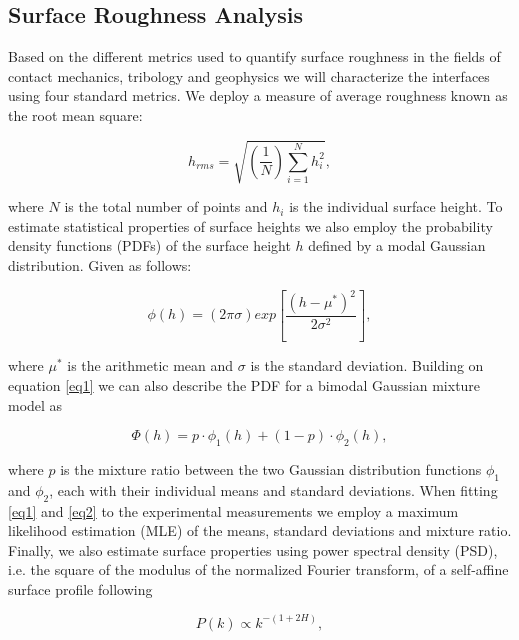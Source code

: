 \documentclass[draft]{agujournal2019}
\begin{document}
\subsection{Surface Roughness Analysis}
\label{SRA}

Based on the different metrics used to quantify surface roughness in the fields of contact mechanics, tribology and geophysics we will characterize the interfaces using four standard metrics. We deploy a measure of average roughness known as the root mean square:

\begin{equation}
h_{rms} = \sqrt{\left(\frac{1}{N} \right) \sum^{N}_{i=1} h_{i}^{2}} ,
\label{eq99}
\end{equation}

\noindent where $N$ is the total number of points and $h_{i}$ is the individual surface height. To estimate statistical properties of surface heights we also employ the probability density functions (PDFs) of the surface height $h$ defined by a modal Gaussian distribution. Given as follows:

\begin{equation}
\phi(h) = \left( 2\pi \sigma \right) exp\left[ \frac{\left(h - \mu^{*}\right)^{2}} { 2\sigma^{2}}  \right],
\label{eq1}
\end{equation} 

\noindent where $\mu^{*}$ is the arithmetic mean and $\sigma$ is the standard deviation. Building on equation \eqref{eq1} we can also describe the PDF for a bimodal Gaussian mixture model as 

\begin{equation}
\Phi(h) = p\cdot \phi_{1}(h)+\left(1-p\right)\cdot \phi_{2}(h),
\label{eq2}
\end{equation}

\noindent where $p$ is the mixture ratio between the two Gaussian distribution functions $\phi_{1}$ and $\phi_{2}$, each with their individual means and standard deviations. When fitting \eqref{eq1} and \eqref{eq2} to the experimental measurements we employ a maximum likelihood estimation (MLE) of the means, standard deviations and mixture ratio. Finally, we also estimate surface properties using power spectral density (PSD), i.e.  the square of the modulus of the normalized Fourier transform, of a self-affine surface profile following 

\begin{equation}
P(k) \propto k^{-(1+2H)},
\label{eq999}
\end{equation}
\end{document}
